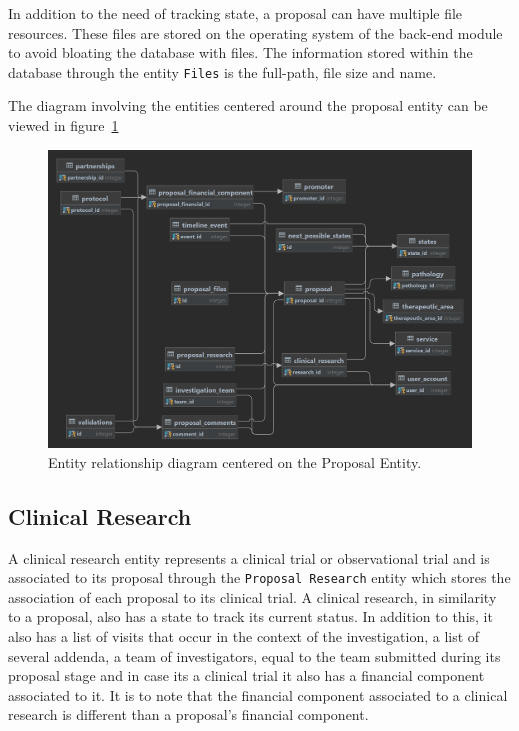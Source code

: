 In addition to the need of tracking state, a proposal can have multiple file resources.
These files are stored on the operating system of the back-end module to avoid bloating the database with files. The information stored within the database through the entity \texttt{Files} is the full-path, file size and name.

The diagram involving the entities centered around the proposal entity can be viewed in figure~\ref{fig:er-diagram-proposal}

\begin{figure}[H]
    \centering
    \includegraphics[scale=0.15]{Chapters/img/model/Proposal-centered-er-diagram.png}
    \caption{Entity relationship diagram centered on the Proposal Entity.}
    \label{fig:er-diagram-proposal}
\end{figure}

\subsection{Clinical Research}
A clinical research entity represents a clinical trial or observational trial and is associated to its proposal through the \texttt{Proposal Research} entity which stores the association of each proposal to its clinical trial. A clinical research, in similarity to a proposal, also has a state to track its current status. In addition to this, it also has a list of visits that occur in the context of the investigation, a list of several addenda, a team of investigators, equal to the team submitted during its proposal stage and in case its a clinical trial it also has a financial component associated to it. It is to note that the financial component associated to a clinical research is different than a proposal's financial component. 

